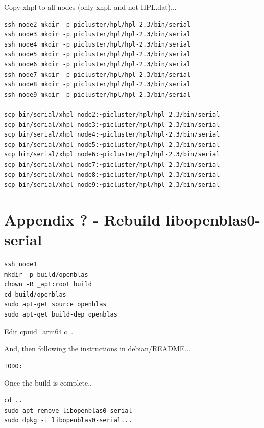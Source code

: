 \documentclass{article}
\begin{document}
Copy xhpl to all nodes (only xhpl, and not HPL.dat)...

\begin{lstlisting}[]
ssh node2 mkdir -p picluster/hpl/hpl-2.3/bin/serial
ssh node3 mkdir -p picluster/hpl/hpl-2.3/bin/serial
ssh node4 mkdir -p picluster/hpl/hpl-2.3/bin/serial
ssh node5 mkdir -p picluster/hpl/hpl-2.3/bin/serial
ssh node6 mkdir -p picluster/hpl/hpl-2.3/bin/serial
ssh node7 mkdir -p picluster/hpl/hpl-2.3/bin/serial
ssh node8 mkdir -p picluster/hpl/hpl-2.3/bin/serial
ssh node9 mkdir -p picluster/hpl/hpl-2.3/bin/serial

scp bin/serial/xhpl node2:~picluster/hpl/hpl-2.3/bin/serial
scp bin/serial/xhpl node3:~picluster/hpl/hpl-2.3/bin/serial
scp bin/serial/xhpl node4:~picluster/hpl/hpl-2.3/bin/serial
scp bin/serial/xhpl node5:~picluster/hpl/hpl-2.3/bin/serial
scp bin/serial/xhpl node6:~picluster/hpl/hpl-2.3/bin/serial
scp bin/serial/xhpl node7:~picluster/hpl/hpl-2.3/bin/serial
scp bin/serial/xhpl node8:~picluster/hpl/hpl-2.3/bin/serial
scp bin/serial/xhpl node9:~picluster/hpl/hpl-2.3/bin/serial
\end{lstlisting}



%
%
\clearpage\section*{Appendix ? - Rebuild libopenblas0-serial}



\lstset{style=termstyle}
\begin{lstlisting}
ssh node1
mkdir -p build/openblas
chown -R _apt:root build
cd build/openblas
sudo apt-get source openblas
sudo apt-get build-dep openblas
\end{lstlisting}

Edit cpuid\_arm64.c...

And, then following the instructions in debian/README...

\lstset{style=termstyle}
\begin{lstlisting}
TODO:
\end{lstlisting}

Once the build is complete..

\lstset{style=termstyle}
\begin{lstlisting}
cd ..
sudo apt remove libopenblas0-serial
sudo dpkg -i libopenblas0-serial...
\end{lstlisting}
\end{document}
